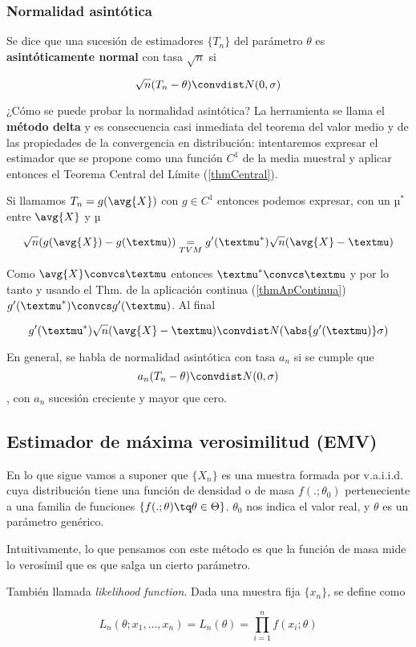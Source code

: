 \documentclass{apuntes}
\begin{document}
\subsubsection{Normalidad asintótica} Se dice que una sucesión de estimadores $\{T_n\}$ del parámetro $\theta$ es \textbf{asintóticamente normal} con tasa $\sqrt{n}$ si

\[ \sqrt{n} (T_n - \theta) \convdist N(0,\sigma) \]

¿Cómo se puede probar la normalidad asintótica? La herramienta se llama el \textbf{método delta}  y es consecuencia casi inmediata del teorema del valor medio y de las propiedades de la convergencia en distribución: intentaremos expresar el estimador que se propone como una función $C^1$ de la media muestral y aplicar entonces el Teorema Central del Límite (\ref{thmCentral}).

Si llamamos $T_n = g(\avg{X})$ con $g\in C^1$ entonces podemos expresar, con un $µ^\ast$ entre $\avg{X}$ y $µ$

\[ \sqrt{n} (g(\avg{X}) - g(µ)) \underset{TVM}{=} g'(µ^\ast) \sqrt{n}(\avg{X} -µ) \]

Como $\avg{X}\convcs µ$ entonces $µ^\ast \convcs µ$ y por lo tanto y usando el Thm. de la aplicación continua (\ref{thmApContinua}) $g'(µ^\ast)\convcs g'(µ)$. Al final 

\[ g'(µ^\ast) \sqrt{n}(\avg{X} -µ) \convdist N(\abs{g'(µ)}\sigma) \]

En general, se habla de normalidad asintótica con tasa $a_n$ si se cumple que \[ a_n (T_n - \theta) \convdist N(0,\sigma) \], con $a_n$ sucesión creciente y mayor que cero.

\subsection{Estimador de máxima verosimilitud (EMV)}

En lo que sigue vamos a suponer que $\{X_n\}$ es una muestra formada por v.a.i.i.d. cuya distribución tiene una función de densidad o de masa $f(.;\theta_0)$ perteneciente a una familia de funciones $\{f(.;\theta) \tq \theta \in \Theta\}$. $\theta_0$ nos indica el valor real, y $\theta$ es un parámetro genérico.

Intuitivamente, lo que pensamos con este método es que la función de masa mide lo verosímil que es que salga un cierto parámetro. 

\begin{defn} También llamada \textit{likelihood function}. Dada una muestra fija $\{x_n\}$, se define como

\[ L_n(\theta;x_1,\dotsc,x_n) = L_n(\theta) = \prod_{i=1}^n f(x_i;\theta) \]
\end{defn}
\end{document}
